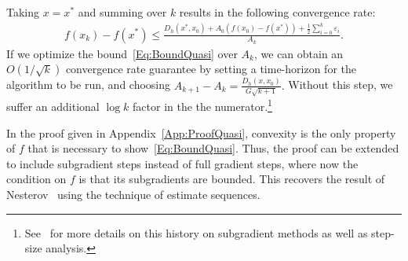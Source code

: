 \documentclass[11pt]{article}
\theoremstyle{plain}
\begin{document}
\noindent Taking $x = x^\ast$ and summing over $k$ results in the following convergence rate:
\begin{align}\label{Eq:BoundQuasi}
f(x_k) - f(x^\ast) \leq \frac{D_h(x^\ast , x_0) +A_0 (f(x_0) - f(x^\ast)) + \frac{1}{2}\sum_{i=0}^{k}\varepsilon_i }{A_k}.
\end{align}
If we optimize the bound~\eqref{Eq:BoundQuasi} over $A_k$, we can obtain an $O(1/\sqrt{k})$ convergence rate guarantee by setting a time-horizon for the algorithm to be run, and choosing $A_{k+1} - A_{k} =\frac{D_h(x,x_0)}{G\sqrt{k+1}}.$ Without this step, we suffer an additional $\log k$ factor in the the numerator.\footnote{See~\cite[2]{Nesterov15} for more details on this history on subgradient methods as well as step-size analysis.}

 In the proof given in Appendix~\ref{App:ProofQuasi}, convexity is the only property of $f$ that is necessary to show~\eqref{Eq:BoundQuasi}. Thus, the proof can be extended to include subgradient steps instead of full gradient steps, where now the condition on $f$ is that its subgradients are  bounded. This recovers the result of Nesterov~\cite{Nesterov15} using the technique of estimate sequences. 
\end{document}
